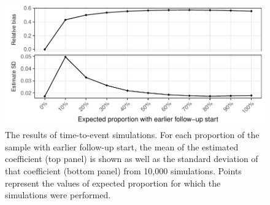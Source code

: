 \begin{figure}[htp]
	\centering
	\includegraphics[width=1\textwidth]{../cox-tarprop-plot/long.pdf}
	\caption{
		The results of time-to-event simulations. For each proportion of the sample with earlier follow-up start, the mean of the estimated coefficient (top panel) is shown as well as the standard deviation of that coefficient (bottom panel) from 10,000 simulations. Points represent the values of expected proportion for which the simulations were performed.
	}
	\label{CoxSimLong}
\end{figure}
